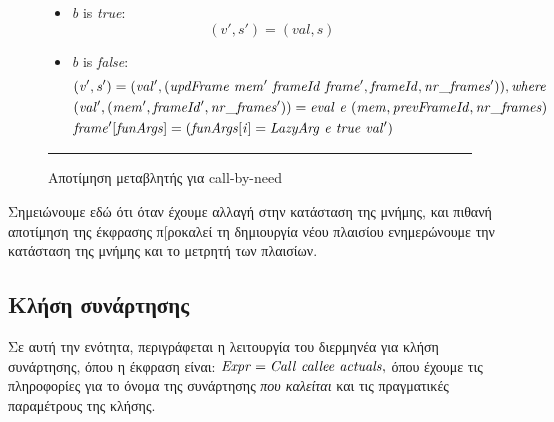 \documentclass[diploma]{softlab-thesis}
\begin{document}
\begin{itemize}
\begin{figure}[t]
      \begin{itemize}
          \item \textit{b} is \textit{true}: \[ \mathit{(v', s') = (val, s)} \]
          \item \textit{b} is \textit{false}:
            \begin{align*}
                & \mathit{(v', s') = (val', (updFrame \hfill\ mem' \hfill\ frameId \hfill\ frame', frameId, nr\_frames')), where} \\
                & \mathit{(val', (mem', frameId', nr\_frames')) = eval \hfill\ e \hfill\ (mem, prevFrameId, nr\_frames)} \\
                & \mathit{frame'[funArgs] = ( funArgs[i] = LazyArg \hfill\ e \hfill\ true \hfill\ val' )} \\
            \end{align*}
      \end{itemize}
    \caption{Αποτίμηση μεταβλητής για call-by-need\label{fig:lazy-varlookup-el}}
    \hrule
  \end{figure}


 Σημειώνουμε εδώ ότι όταν έχουμε αλλαγή στην κατάσταση της μνήμης, και πιθανή αποτίμηση της έκφρασης π[ροκαλεί τη δημιουργία νέου πλαισίου
 ενημερώνουμε την κατάσταση της μνήμης και το μετρητή των πλαισίων.

  \end{itemize}


  \subsection{Κλήση συνάρτησης}

  Σε αυτή την ενότητα, περιγράφεται η λειτουργία του διερμηνέα για κλήση συνάρτησης, όπου η έκφραση είναι:
  $ \mathit{Expr = Call \hfill\ callee \hfill\ actuals,} $
  όπου έχουμε τις πληροφορίες για το όνομα της συνάρτησης \textit{που καλείται} και τις πραγματικές παραμέτρους της κλήσης.
  
\end{document}
